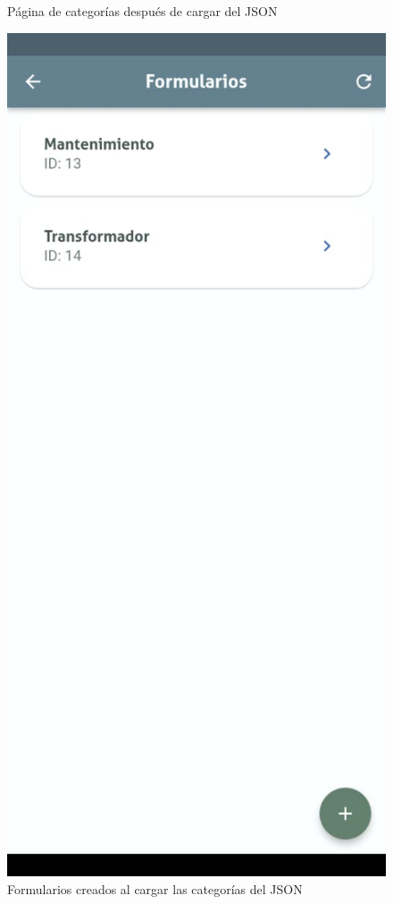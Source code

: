 \documentclass[12pt, a4paper]{book}
\begin{document}
\begin{figure}[H]
\begin{minipage}[b]{0.3\textwidth}
    \caption{Página de categorías después de cargar del JSON}
    \label{fig:loadcategories2}
  \end{minipage}
  \hspace{0.02\textwidth}
  \begin{minipage}[b]{0.3\textwidth}
    \centering
    \includegraphics[width=\textwidth]{images/functionality_test/load_categories_3.jpg}
    \caption{Formularios creados al cargar las categorías del JSON}
    \label{fig:loadcategories3}
  \end{minipage}
\end{figure}
\end{document}
